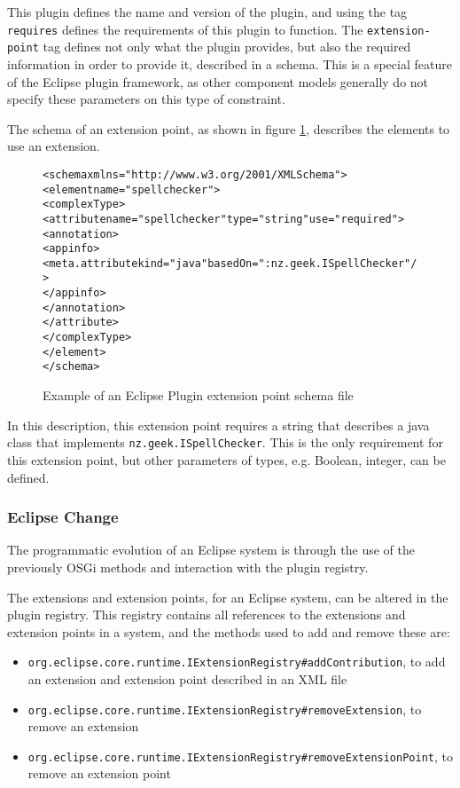 This plugin defines the name and version of the plugin, and using the tag \texttt{requires} defines the requirements of this plugin to function.
The \texttt{extension-point} tag defines not only what the plugin provides, but also the required information in order to provide it, described in a schema.
This is a special feature of the Eclipse plugin framework, as other component models generally do not specify these parameters on this type of constraint. 

The schema of an extension point, as shown in figure \ref{eclipseextensionschema}, describes the elements to use an extension.

\begin{figure}[htp]
\begin{center}
\begin{alltt}
<schema xmlns="http://www.w3.org/2001/XMLSchema">
 <element name="spellchecker">
  <complexType>
   <attribute name="spellchecker" type="string" use="required">
    <annotation>
     <appinfo>
      <meta.attribute kind="java" basedOn=":nz.geek.ISpellChecker"/>
     </appinfo>
    </annotation>
   </attribute>
  </complexType>
 </element>
</schema>
\end{alltt}
  \caption{Example of an Eclipse Plugin extension point schema file}
  \label{eclipseextensionschema}
\end{center}
\end{figure}

In this description, this extension point requires a string that describes a java class that implements \texttt{nz.geek.ISpellChecker}.
This is the only requirement for this extension point, but other parameters of types, e.g. Boolean, integer, can be defined.

\subsubsection{Eclipse Change}
The programmatic evolution of an Eclipse system is through the use of the previously OSGi methods and interaction with the plugin registry.

The extensions and extension points, for an Eclipse system, can be altered in the plugin registry.
This registry contains all references to the extensions and extension points in a system,
and the methods used to add and remove these are:

\begin{itemize}
  \item \texttt{org.eclipse.core.runtime.IExtensionRegistry}\verb+#+\texttt{addContribution}, to add an extension and extension point described in an XML file
  \item \texttt{org.eclipse.core.runtime.IExtensionRegistry}\verb+#+\texttt{removeExtension}, to remove an extension
  \item \texttt{org.eclipse.core.runtime.IExtensionRegistry}\verb+#+\texttt{removeExtensionPoint}, to remove an extension point
\end{itemize}


